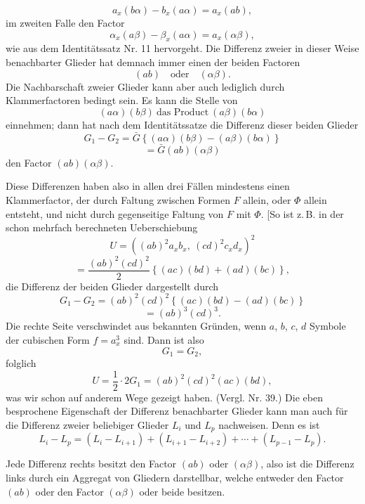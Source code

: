 \documentclass[11pt]{article}
\providecommand{\weberpage}[1]{}
\providecommand{\weq}[2]{\begin{equation}\tag{#1}#2\end{equation}}
\let\Phi\varPhi
\begin{document}
\weberpage{44}
\[
a_x(b\alpha) - b_x(a\alpha) = a_x(ab), %
\]
im zweiten Falle den Factor
\[
\alpha_x(a\beta) - \beta_x(a\alpha) = a_x(\alpha\beta),
\]
wie aus dem Identitätssatz Nr. 11 hervorgeht.
Die Differenz zweier in dieser Weise benachbarter Glieder hat
demnach immer einen der beiden Factoren
\[
(ab)\quad\text{oder}\quad(\alpha\beta).
\]
Die Nachbarschaft zweier Glieder kann aber auch lediglich durch
Klammerfactoren bedingt sein. Es kann die Stelle von
\weq{3}{(a\alpha)(b\beta)\ \text{das Product}\ (a\beta)(b\alpha)}
einnehmen; dann hat nach dem Identitätssatze die Differenz dieser
beiden Glieder
\[
G_1 - G_2 = \bar{G}\left\{(a\alpha)(b\beta) - (a\beta)(b\alpha)\right\}
\]
\[
= \bar{G}(ab)(\alpha\beta)
\]
den Factor $(ab)(\alpha\beta)$.

\glqq Diese Differenzen haben also in allen drei Fällen mindestens
einen Klammerfactor, der durch Faltung zwischen Formen $F$
allein, oder $\Phi$ allein entsteht, und nicht durch gegenseitige
Faltung von $F$ mit $\Phi$.\grqq{}
[So ist z.\,B. in der schon mehrfach berechneten Ueberschiebung
\[
U = \left((ab)^2 a_x b_x,\ (cd)^2 c_x d_x\right)^2
\]
\[
= \frac{(ab)^2(cd)^2}{2}\left\{(ac)(bd) + (ad)(bc)\right\},
\]
die Differenz der beiden Glieder dargestellt durch
\[
G_1 - G_2 = (ab)^2(cd)^2\left\{(ac)(bd) - (ad)(bc)\right\}
\]
\[
= (ab)^3(cd)^3.
\]
Die rechte Seite verschwindet aus bekannten Gründen, wenn $a$,
$b$, $c$, $d$ Symbole der cubischen Form $f = a_x^3$ sind. Dann ist also
\[
G_1 = G_2,
\]
folglich
\[
U = \frac{1}{2}\cdot 2 G_1 = (ab)^2(cd)^2(ac)(bd),
\]
was wir schon auf anderem Wege gezeigt haben. (Vergl. Nr. 39.)
Die eben besprochene Eigenschaft der Differenz benachbarter
Glieder kann man auch für die Differenz zweier beliebiger Glieder
$L_i$ und $L_p$ nachweisen. Denn es ist
\[
L_i - L_p = (L_i - L_{i+1}) + (L_{i+1} - L_{i+2}) + \cdots + (L_{p-1} - L_p).
\]


\weberpage{45}
Jede Differenz rechts besitzt den Factor $(ab)$ oder $(\alpha\beta)$, also ist
die Differenz links durch ein Aggregat von Gliedern darstellbar, welche
entweder den Factor $(ab)$ oder den Factor $(\alpha\beta)$ oder beide besitzen.
\end{document}
